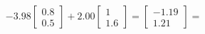 \documentclass[preview]{standalone}
\begin{document}
\begin{align*}
-3.98 \begin{bmatrix} 0.8 \\ 0.5 \end{bmatrix} + 2.00 \begin{bmatrix} 1 \\ 1.6 \end{bmatrix} = \begin{bmatrix} -1.19 \\ 1.21 \end{bmatrix} =
\end{align*}
\end{document}
